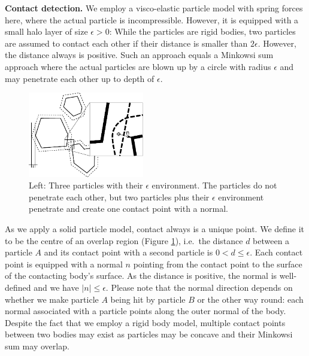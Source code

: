 {\bf Contact detection.}
We employ a visco-elastic particle model with spring forces here, where the
actual particle is incompressible.
However, it is equipped with a small halo layer of size $\epsilon >0$:
While the particles are rigid bodies, two particles are assumed to contact each
other if their distance is smaller than $2\epsilon$. 
However, the distance always is positive.
Such an approach equals a Minkowsi sum approach where the actual particles are
blown up by a circle with radius $\epsilon$ and may penetrate each other up to
depth of $\epsilon $.


\begin{figure}[htb]
  \begin{center}
    \includegraphics[width=0.45\textwidth]{sketches/minkowski.pdf}
  \end{center}
  \caption{
    Left: Three particles with their $\epsilon $ environment. The particles do
    not penetrate each other, but two particles plus their $\epsilon $
    environment penetrate and create one contact point with a normal. 
  }
  \label{figure:minkowski}
\end{figure}

As we apply a solid particle model, contact always is a unique point. 
We define it to be the centre of an overlap region (Figure \ref{figure:minkowski}), i.e.~the
distance $d$ between a particle $A$ and its contact point with a second particle
is $0 < d \leq \epsilon$.
Each contact point is equipped with a normal $n$ pointing from the contact point
to the surface of the contacting body's surface.
As the distance is positive, the normal is well-defined and we have $|n| \leq
\epsilon $.
Please note that the normal direction depends on whether we make particle $A$
being hit by particle $B$ or the other way round: each normal associated with a
particle points along the outer normal of the body.
Despite the fact that we employ a rigid body model, multiple contact points
between two bodies may exist as particles may be concave and their Minkowsi sum
may overlap.


